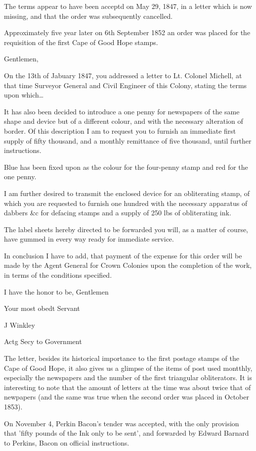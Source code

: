 The terms appear to have been acceptd on May 29, 1847, in a letter which is now missing, and that the order was subsequently cancelled.

Approximately five year later on 6th September 1852 an order was placed for the requisition of the first Cape of Good Hope stamps.


Gentlemen,

On the 13th of Jabuary 1847, you addressed a letter to Lt. Colonel Michell, at that time Surveyor General and Civil Engineer of this Colony, stating the terms upon which\ldots

It has also been decided to introduce a one penny for newspapers of the same shape and device but of a different colour, and with the necessary alteration of border. Of this description I am to request you to furnish an immediate first supply of fifty thousand, and a monthly remittance of five thousand, until further instructions. 

Blue has been fixed upon as the colour for the four-penny stamp and red for the one penny. 

I am further desired to transmit the enclosed device for an obliterating stamp, of which you are requested to furnish one hundred with the necessary apparatus of dabbers \&c for defacing stamps and a supply of 250 lbs of obliterating ink.

The label sheets hereby directed to be forwarded you will, as a matter of course, have gummed in every way ready for immediate service.

In conclusion I have to add, that payment of the expense for this order will be made by the Agent General for Crown Colonies upon the completion of the work, in terms of the conditions specified.

I have the honor to be, Gentlemen

Your most obedt Servant

J Winkley

Actg Secy to Government

The letter, besides its historical importance to the first postage stamps of the Cape of Good Hope, it also gives us a glimpse of the items of post used montthly, especially the newspapers and the number of the first triangular obliterators. It is interesting to note that the amount of letters at the time was about twice that of newpapers (and the same was true when the second order  was placed in October 1853).

On November 4, Perkin Bacon's tender was accepted, with the only provision that 'fifty pounds of the Ink only to be sent', and forwarded by Edward Barnard to Perkins, Bacon on official instructions.

